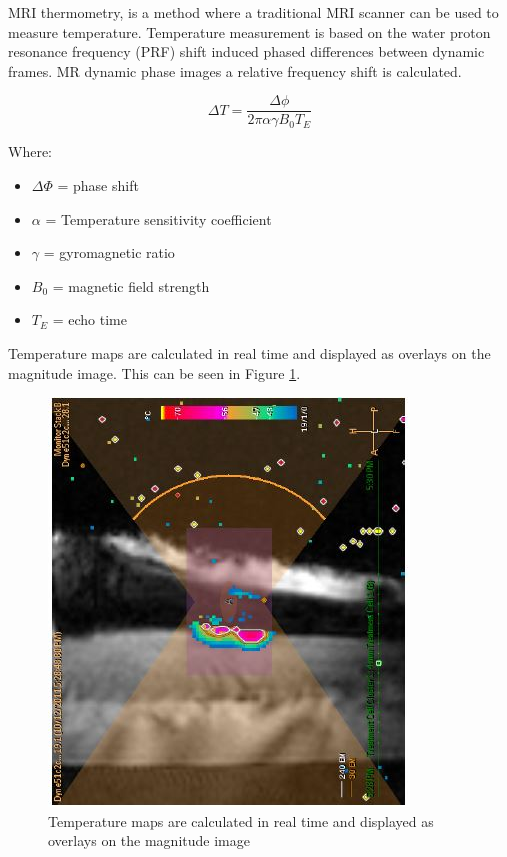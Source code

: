 \documentclass[11pt]{article} %
\begin{document}
	MRI thermometry, is a method where a traditional MRI scanner can be used to measure temperature. Temperature measurement is based on the water proton resonance frequency (PRF) shift induced phased differences between dynamic frames. MR dynamic phase images a relative frequency shift is calculated. 
	
	\begin{equation}
	\Delta T= \frac{\Delta \phi}{2 \pi \alpha \gamma B_0 T_E}
	\end{equation}
	
	Where: 
	\begin{itemize}
		\item $\Delta \Phi $ = phase shift 
		\item $\alpha$ = Temperature sensitivity coefficient 
		\item $\gamma$ = gyromagnetic ratio
		\item $B_0$ = magnetic field strength
		\item $T_E$ = echo time 
	\end{itemize}

	Temperature maps are calculated in real time and displayed as overlays on the magnitude image. This can be seen in Figure \ref{fig:mriimage}.
	
	\begin{figure}
		\centering
		\includegraphics[width=0.7\linewidth]{Report_images/MRIimage}
		\caption{Temperature maps are calculated in real time and displayed as overlays on the magnitude image}
		\label{fig:mriimage}
	\end{figure}
	
\end{document}
